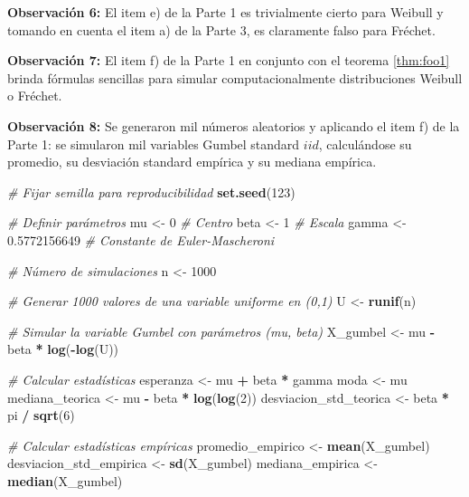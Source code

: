 \documentclass[
  20pt,
]{book}
\newenvironment{Shaded}{\begin{snugshade}}{\end{snugshade}}
\newcommand{\CommentTok}[1]{\textcolor[rgb]{0.56,0.35,0.01}{\textit{#1}}}
\newcommand{\DecValTok}[1]{\textcolor[rgb]{0.00,0.00,0.81}{#1}}
\newcommand{\FloatTok}[1]{\textcolor[rgb]{0.00,0.00,0.81}{#1}}
\newcommand{\FunctionTok}[1]{\textcolor[rgb]{0.13,0.29,0.53}{\textbf{#1}}}
\newcommand{\NormalTok}[1]{#1}
\newcommand{\OtherTok}[1]{\textcolor[rgb]{0.56,0.35,0.01}{#1}}
\newcommand{\SpecialCharTok}[1]{\textcolor[rgb]{0.81,0.36,0.00}{\textbf{#1}}}
\theoremstyle{definition}
\theoremstyle{definition}
\theoremstyle{definition}
\theoremstyle{definition}
\theoremstyle{remark}
\begin{document}
\textbf{Observación 6:} El item e) de la Parte 1 es
trivialmente cierto para Weibull y tomando en
cuenta el item a) de la Parte 3, es claramente falso
para Fréchet.

\textbf{Observación 7:} El item f) de la Parte 1 en
conjunto con el teorema \ref{thm:foo1} brinda fórmulas
sencillas para simular computacionalmente
distribuciones Weibull o Fréchet.

\textbf{Observación 8:} Se generaron mil números aleatorios y aplicando el
item f) de la Parte 1: se simularon mil variables
Gumbel standard \(iid\), calculándose su promedio, su
desviación standard empírica y su mediana
empírica.

\begin{Shaded}
\begin{Highlighting}[]
\CommentTok{\# Fijar semilla para reproducibilidad}
\FunctionTok{set.seed}\NormalTok{(}\DecValTok{123}\NormalTok{)}

\CommentTok{\# Definir parámetros}
\NormalTok{mu }\OtherTok{\textless{}{-}} \DecValTok{0}       \CommentTok{\# Centro}
\NormalTok{beta }\OtherTok{\textless{}{-}} \DecValTok{1}     \CommentTok{\# Escala}
\NormalTok{gamma }\OtherTok{\textless{}{-}} \FloatTok{0.5772156649}  \CommentTok{\# Constante de Euler{-}Mascheroni}

\CommentTok{\# Número de simulaciones}
\NormalTok{n }\OtherTok{\textless{}{-}} \DecValTok{1000}

\CommentTok{\# Generar 1000 valores de una variable uniforme en (0,1)}
\NormalTok{U }\OtherTok{\textless{}{-}} \FunctionTok{runif}\NormalTok{(n)}

\CommentTok{\# Simular la variable Gumbel con parámetros (mu, beta)}
\NormalTok{X\_gumbel }\OtherTok{\textless{}{-}}\NormalTok{ mu }\SpecialCharTok{{-}}\NormalTok{ beta }\SpecialCharTok{*} \FunctionTok{log}\NormalTok{(}\SpecialCharTok{{-}}\FunctionTok{log}\NormalTok{(U))}

\CommentTok{\# Calcular estadísticas}
\NormalTok{esperanza }\OtherTok{\textless{}{-}}\NormalTok{ mu }\SpecialCharTok{+}\NormalTok{ beta }\SpecialCharTok{*}\NormalTok{ gamma}
\NormalTok{moda }\OtherTok{\textless{}{-}}\NormalTok{ mu}
\NormalTok{mediana\_teorica }\OtherTok{\textless{}{-}}\NormalTok{ mu }\SpecialCharTok{{-}}\NormalTok{ beta }\SpecialCharTok{*} \FunctionTok{log}\NormalTok{(}\FunctionTok{log}\NormalTok{(}\DecValTok{2}\NormalTok{))}
\NormalTok{desviacion\_std\_teorica }\OtherTok{\textless{}{-}}\NormalTok{ beta }\SpecialCharTok{*}\NormalTok{ pi }\SpecialCharTok{/} \FunctionTok{sqrt}\NormalTok{(}\DecValTok{6}\NormalTok{)}

\CommentTok{\# Calcular estadísticas empíricas}
\NormalTok{promedio\_empirico }\OtherTok{\textless{}{-}} \FunctionTok{mean}\NormalTok{(X\_gumbel)}
\NormalTok{desviacion\_std\_empirica }\OtherTok{\textless{}{-}} \FunctionTok{sd}\NormalTok{(X\_gumbel)}
\NormalTok{mediana\_empirica }\OtherTok{\textless{}{-}} \FunctionTok{median}\NormalTok{(X\_gumbel)}
\end{Highlighting}
\end{Shaded}
\end{document}
